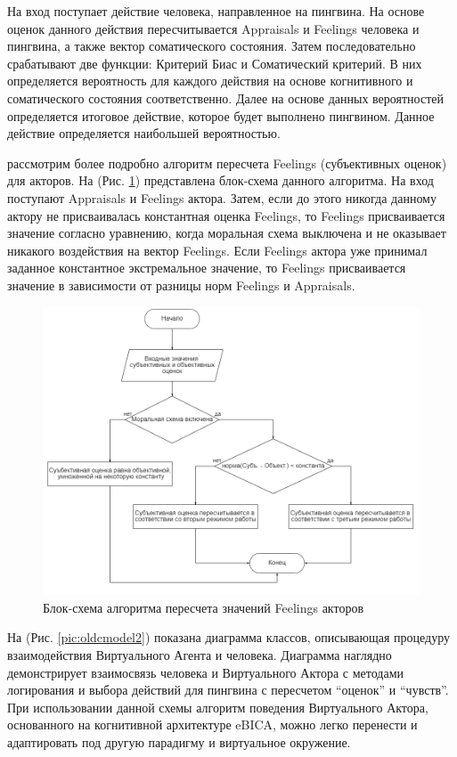 На вход поступает действие человека, направленное на пингвина. На основе оценок данного действия пересчитывается Appraisals и Feelings человека и пингвина, а также 
вектор соматического состояния. Затем последовательно срабатывают две функции: Критерий Биас и Соматический критерий. 
В них определяется вероятность для каждого действия на основе когнитивного и соматического состояния соответственно.
Далее на основе данных вероятностей определяется итоговое действие, которое будет выполнено пингвином. 
Данное действие определяется наибольшей вероятностью. 

рассмотрим более подробно алгоритм пересчета Feelings (субъективных оценок) для акторов. На (Рис. \ref{pic:oldcmodel1}) представлена блок-схема данного алгоритма. На вход поступают Appraisals и Feelings актора. 
Затем, если до этого никогда данному актору не присваивалась константная оценка Feelings, то Feelings присваивается значение согласно уравнению, 
когда моральная схема выключена и не оказывает никакого воздействия на вектор Feelings. 
Если Feelings актора уже принимал заданное константное экстремальное значение, то Feelings присваивается значение в зависимости от разницы норм Feelings и Appraisals.

\begin{figure}[h]
\includegraphics[width=0.75\columnwidth]{./img/oldcmodel1.png}
\centering
\caption{Блок-схема алгоритма пересчета значений Feelings акторов}
\label{pic:oldcmodel1}
\end{figure}

На (Рис. \ref{pic:oldcmodel2}) показана диаграмма классов, описывающая процедуру взаимодействия Виртуального Агента и человека. 
Диаграмма наглядно демонстрирует взаимосвязь человека и 
Виртуального Актора с методами логирования и выбора действий для пингвина с пересчетом “оценок” и “чувств”. 
При использовании данной схемы алгоритм поведения Виртуального Актора, основанного на когнитивной архитектуре eBICA, можно легко перенести и адаптировать 
под другую парадигму и виртуальное окружение.


